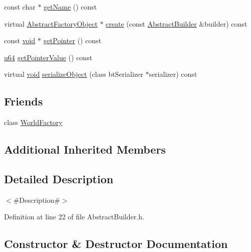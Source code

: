 \begin{DoxyCompactItemize}
\item 
const char $\ast$ \mbox{\hyperlink{classnjli_1_1_abstract_builder_ad41266885be835f3ee602311e20877a4}{get\+Name}} () const
\item 
virtual \mbox{\hyperlink{classnjli_1_1_abstract_factory_object}{Abstract\+Factory\+Object}} $\ast$ \mbox{\hyperlink{classnjli_1_1_abstract_builder_a83a8876ae63b92804004cf3febe76573}{create}} (const \mbox{\hyperlink{classnjli_1_1_abstract_builder}{Abstract\+Builder}} \&builder) const
\item 
const \mbox{\hyperlink{_thread_8h_af1e856da2e658414cb2456cb6f7ebc66}{void}} $\ast$ \mbox{\hyperlink{classnjli_1_1_abstract_builder_ac4ca71716ed832be357f15f8262c8448}{get\+Pointer}} () const
\item 
\mbox{\hyperlink{_util_8h_ad758b7a5c3f18ed79d2fcd23d9f16357}{u64}} \mbox{\hyperlink{classnjli_1_1_abstract_builder_a4ffddf141a426a5a07d0ac19f1913811}{get\+Pointer\+Value}} () const
\item 
virtual \mbox{\hyperlink{_thread_8h_af1e856da2e658414cb2456cb6f7ebc66}{void}} \mbox{\hyperlink{classnjli_1_1_abstract_builder_a4fc4bcd9d1930911474210c047372fc0}{serialize\+Object}} (class bt\+Serializer $\ast$serializer) const
\end{DoxyCompactItemize}
\subsection*{Friends}
\begin{DoxyCompactItemize}
\item 
class \mbox{\hyperlink{classnjli_1_1_abstract_builder_acb96ebb09abe8f2a37a915a842babfac}{World\+Factory}}
\end{DoxyCompactItemize}
\subsection*{Additional Inherited Members}


\subsection{Detailed Description}
$<$\#\+Description\#$>$ 

Definition at line 22 of file Abstract\+Builder.\+h.



\subsection{Constructor \& Destructor Documentation}
\mbox{\label{classnjli_1_1_abstract_builder_a0cfdd77fe097b255a5ca29c70675ed0a}} 
